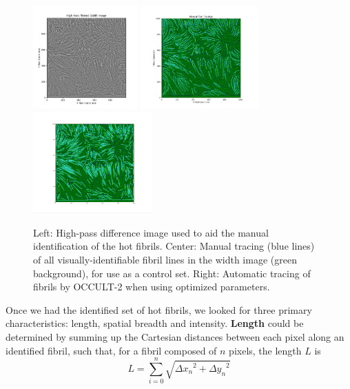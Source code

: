 \documentclass{iau}
\begin{document}
\begin{figure}[h]
\begin{center}
\includegraphics[width=4cm]{highpass.png} 
\includegraphics[width=4.53cm]{manual.png} 
 \includegraphics[width=4.57cm]{occult.png}  
 \caption{Left: High-pass difference image used to aid the manual identification of the hot fibrils. Center: Manual tracing (blue lines) of all visually-identifiable fibril lines in the width image (green background), for use as a control set. Right: Automatic tracing of fibrils by OCCULT-2 when using optimized parameters.} \label{fig_fibrils}
\end{center}
\end{figure}

Once we had the identified set of hot fibrils, we looked for three primary characteristics: length, spatial breadth and intensity. \textbf{Length} could be determined by summing up the Cartesian distances between each pixel along an identified fibril, such that, for a fibril composed of $n$ pixels, the length $L$ is
\begin{displaymath}
    L = \sum^n_{i=0} \sqrt{{\Delta x_n}^2+{\Delta y_n}^2}
\end{displaymath}
\end{document}
